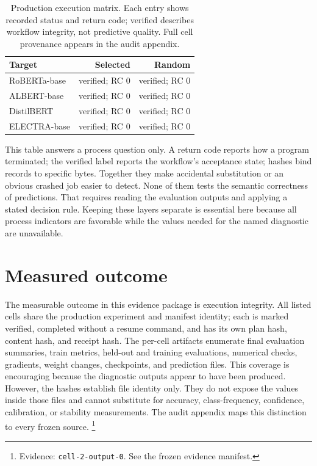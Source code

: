 \documentclass[10pt,twocolumn,letterpaper]{article}
\begin{document}
\begin{table}[H]\centering\normalsize
\caption{Production execution matrix. Each entry shows recorded status and return code; verified describes workflow integrity, not predictive quality. Full cell provenance appears in the audit appendix.}
\begin{tabularx}{\columnwidth}{@{}Xrr@{}}
\toprule
Target & Selected & Random \\ \midrule
RoBERTa-base & verified; RC 0 & verified; RC 0 \\
ALBERT-base & verified; RC 0 & verified; RC 0 \\
DistilBERT & verified; RC 0 & verified; RC 0 \\
ELECTRA-base & verified; RC 0 & verified; RC 0 \\
\bottomrule\end{tabularx}\end{table}
This table answers a process question only. A return code reports how a program terminated; the verified label reports the workflow's acceptance state; hashes bind records to specific bytes. Together they make accidental substitution or an obvious crashed job easier to detect. None of them tests the semantic correctness of predictions. That requires reading the evaluation outputs and applying a stated decision rule. Keeping these layers separate is essential here because all process indicators are favorable while the values needed for the named diagnostic are unavailable.

\section{Measured outcome}
The measurable outcome in this evidence package is execution integrity. All listed cells share the production experiment and manifest identity; each is marked verified, completed without a resume command, and has its own plan hash, content hash, and receipt hash. The per-cell artifacts enumerate final evaluation summaries, train metrics, held-out and training evaluations, numerical checks, gradients, weight changes, checkpoints, and prediction files. This coverage is encouraging because the diagnostic outputs appear to have been produced. However, the hashes establish file identity only. They do not expose the values inside those files and cannot substitute for accuracy, class-frequency, confidence, calibration, or stability measurements. The audit appendix maps this distinction to every frozen source. \footnote{Evidence: \texttt{cell-2-output-0}. See the frozen evidence manifest.}
\end{document}
